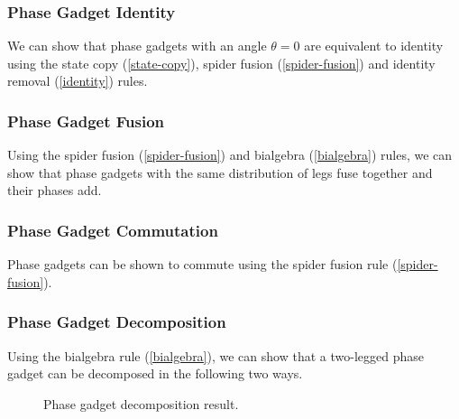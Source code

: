 
\subsubsection{Phase Gadget Identity}%

We can show that phase gadgets with an angle $\theta = 0$ are equivalent to identity using the state copy (\ref{state-copy}), spider fusion (\ref{spider-fusion}) and identity removal (\ref{identity}) rules.



\subsubsection{Phase Gadget Fusion}%
\label{phase-gadget-fusion}
Using the spider fusion (\ref{spider-fusion}) and bialgebra (\ref{bialgebra}) rules, we can show that phase gadgets with the same distribution of legs fuse together and their phases add.



\subsubsection{Phase Gadget Commutation}%
\label{phase-gadget-commutation}

Phase gadgets can be shown to commute using the spider fusion rule (\ref{spider-fusion}).



\subsubsection{Phase Gadget Decomposition}%

Using the bialgebra rule (\ref{bialgebra}), we can show that a two-legged phase gadget can be decomposed in the following two ways.

\begin{figure}[H]
    \centering
    \caption{Phase gadget decomposition result.}
    \label{phase-gadget-decomposition}
\end{figure}

